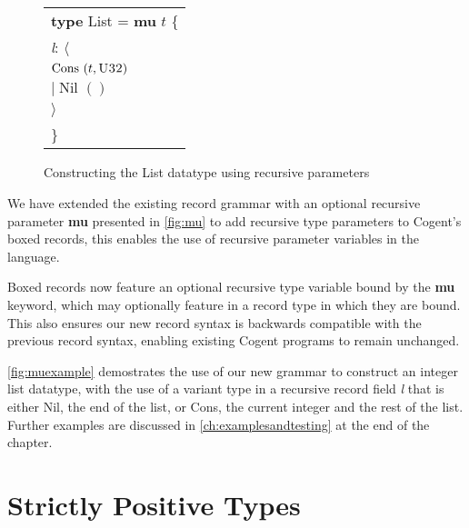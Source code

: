 \begin{figure}
    \centering
    \begin{tabular}{l}
        \textbf{type} List = \textbf{mu} $t$ \{ \\
            \phantom{x}\hspace{2em}\textit{l}: $\langle\;$ \\
            \phantom{x}\hspace{4em} $\text{Cons } (t,\textsc{U32})\;$ \\
            \phantom{x}\hspace{3.7em}$|\; \text{Nil } ()\;$ \\
            \phantom{x}\hspace{2em}$\rangle$ \\
        \} 
    \end{tabular}
    \vspace{2em}
    \caption{Constructing the List datatype using recursive parameters}
    \label{fig:muexample}
\end{figure}

We have extended the existing record grammar with an optional recursive parameter \textbf{mu} presented in
\autoref{fig:mu} to add recursive type parameters to Cogent's boxed records, this enables the use
of recursive parameter variables in the language.

Boxed records now feature an optional recursive type variable bound by the \textbf{mu} keyword, which may
optionally feature in a record type in which they are bound. This also ensures our new record syntax is
backwards compatible with the previous record syntax, enabling existing Cogent programs to remain unchanged.

\autoref{fig:muexample} demostrates the use of our new grammar to construct an integer list datatype,
with the use of a variant type in a recursive record field \textit{l} that is either Nil,
the end of the list, or Cons, the current integer and the rest of the list. Further
examples are discussed in \autoref{ch:examplesandtesting} at the end of the chapter.

\section{Strictly Positive Types}

